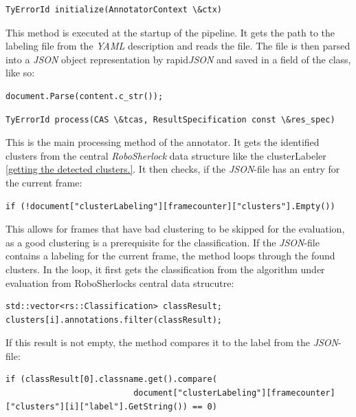 \documentclass[main.tex]{subfiles}
\begin{document}
\begin{lstlisting}
TyErrorId initialize(AnnotatorContext \&ctx)
\end{lstlisting}

This method is executed at the startup of the pipeline.  It gets the path to the labeling file from the \textit{YAML} description and reads the file. The file is then parsed into a \textit{JSON} object representation by rapid\textit{JSON} and saved in a field of the class, like so:

\begin{lstlisting}
document.Parse(content.c_str());
\end{lstlisting}

\begin{lstlisting}
TyErrorId process(CAS \&tcas, ResultSpecification const \&res_spec)
\end{lstlisting}

This is the main processing method of the annotator. It gets the identified clusters from the central \textit{RoboSherlock} data structure like the clusterLabeler \ref{getting the detected clusters.}. It then checks, if the \textit{JSON}-file has an entry for the current frame: 

\begin{lstlisting}
if (!document["clusterLabeling"][framecounter]["clusters"].Empty())
\end{lstlisting}

This allows for frames that have bad clustering to be skipped for the evaluation, as a good clustering is a prerequisite for the classification. If the \textit{JSON}-file contains a labeling for the current frame, the method loops through the found clusters. In the loop, it first gets the classification from the algorithm under evaluation from RoboSherlocks central data strucutre:

\begin{lstlisting}
std::vector<rs::Classification> classResult;
clusters[i].annotations.filter(classResult);
\end{lstlisting}

If this result is not empty, the method compares it to the label from the \textit{JSON}-file:

\begin{lstlisting}
if (classResult[0].classname.get().compare(
                          document["clusterLabeling"][framecounter]["clusters"][i]["label"].GetString()) == 0)
\end{lstlisting}
\end{document}
